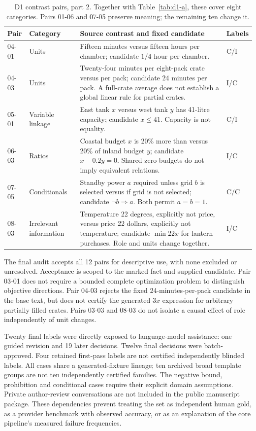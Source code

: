 \begin{table}[htbp]\centering\small
\caption{D1 contrast pairs, part 2. Together with Table~\ref{tab:d1-a}, these cover eight categories. Pairs 01-06 and 07-05 preserve meaning; the remaining ten change it.}\label{tab:d1-b}
\renewcommand{\arraystretch}{1.18}
\begin{tabularx}{\linewidth}{@{}lp{2.1cm}Xl@{}}\toprule
Pair & Category & Source contrast and fixed candidate & Labels\\\midrule
04-01 & Units & Fifteen minutes versus fifteen hours per chamber; candidate $1/4$ hour per chamber. & C/I\\
04-03 & Units & Twenty-four minutes per eight-pack crate versus per pack; candidate 24 minutes per pack. A full-crate average does not establish a global linear rule for partial crates. & I/C\\
05-01 & Variable linkage & East tank $x$ versus west tank $y$ has 41-litre capacity; candidate $x\leq41$. Capacity is not equality. & C/I\\
06-03 & Ratios & Coastal budget $x$ is 20\% more than versus 20\% of inland budget $y$; candidate $x-0.2y=0$. Shared zero budgets do not imply equivalent relations. & I/C\\
07-05 & Conditionals & Standby power $a$ required unless grid $b$ is selected versus if grid is not selected; candidate $\neg b\Rightarrow a$. Both permit $a=b=1$. & C/C\\
08-03 & Irrelevant information & Temperature 22 degrees, explicitly not price, versus price 22 dollars, explicitly not temperature; candidate $\min22x$ for lantern purchases. Role and units change together. & I/C\\\bottomrule
\end{tabularx}\end{table}

The final audit accepts all 12 pairs for descriptive use, with none excluded or unresolved. Acceptance is scoped to the marked fact and supplied candidate. Pair 03-01 does not require a bounded complete optimization problem to distinguish objective directions. Pair 04-03 rejects the fixed 24-minutes-per-pack candidate in the base text, but does not certify the generated $3x$ expression for arbitrary partially filled crates. Pairs 03-03 and 08-03 do not isolate a causal effect of role independently of unit changes.

Twenty final labels were directly exposed to language-model assistance: one guided revision and 19 later decisions. Twelve final decisions were batch-approved. Four retained first-pass labels are not certified independently blinded labels. All cases share a generated-fixture lineage; ten archived broad template groups are not ten independently certified families. The negative bound, prohibition and conditional cases require their explicit domain assumptions. Private author-review conversations are not included in the public manuscript package. These dependencies prevent treating the set as independent human gold, as a provider benchmark with observed accuracy, or as an explanation of the core pipeline's measured failure frequencies.
